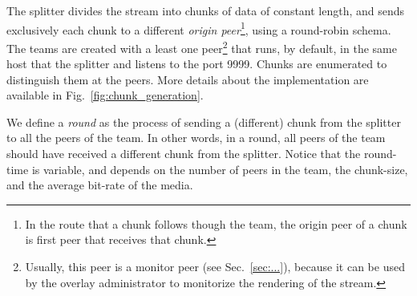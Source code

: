 
\label{sec:feeding_the_team}

The splitter divides the stream into chunks of data of constant
length, and sends exclusively each chunk to a different \emph{origin
  peer}\footnote{In the route that a chunk follows though the team,
  the origin peer of a chunk is first peer that receives that chunk.},
using a round-robin schema. The teams are created with a least one
peer\footnote{Usually, this peer is a monitor peer (see
  Sec.~\ref{sec:...}), because it can be used by the overlay
  administrator to monitorize the rendering of the stream.} that runs,
by default, in the same host that the splitter and listens to the port
9999. Chunks are enumerated to distinguish them at the peers. More
details about the implementation are available in
Fig.~\ref{fig:chunk_generation}.


\begin{figure*}
   \caption{Chunk
    generation at the splitter and their transmission to the
    team.\label{fig:chunk_generation}}
\end{figure*}

We define a \emph{round} as the process of sending a (different) chunk
from the splitter to all the peers of the team. In other words, in a
round, all peers of the team should have received a different chunk
from the splitter. Notice that the round-time is variable, and depends
on the number of peers in the team, the chunk-size, and the average
bit-rate of the media.

\begin{comment}
(in a team) as the time necessary to send two
consecutive chunks from the splitter (of such team) to the same peer,
using the round-robing. This time is variable and depends on $|T|$,
$C$, and the average bit-rate of the media, $A$.
\end{comment}

\begin{comment}
The round-time is defined by:
\begin{equation}
  \cal{r} = \cal{c}N.
  \label{eq:round_time}
\end{equation}
For example, if we use only one team of $N=256$ peers, a chunk size
$C=1024$~bytes, and a video of $1$~Mb/s, the round time is
\begin{displaymath}
  \cal{r} = \frac{1024\frac{\text{bytes}}{\text{chunk}}\times
    8\frac{\text{bits}}{\text{byte}}}{10^6\frac{\text{bits}}{\text{second}}}\times
  256 \approx 2.1~\text{seconds}.
\end{displaymath}
\end{comment}
